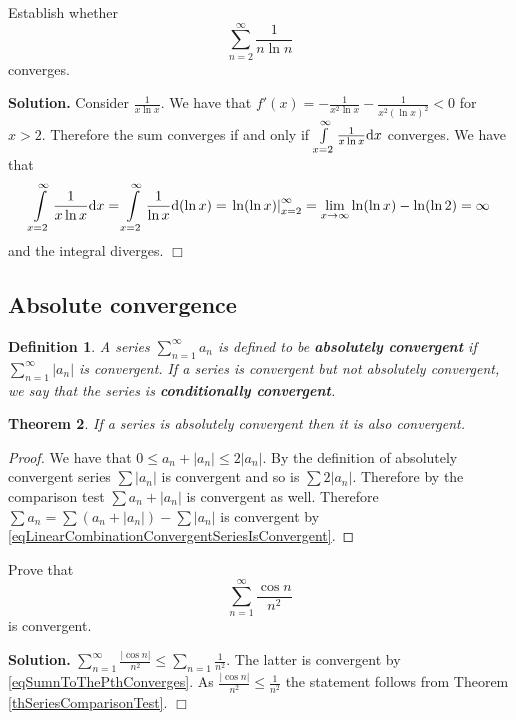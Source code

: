 \documentclass[12pt]{book}
\newenvironment{solution}{\medskip\noindent\textbf{Solution.} }{$\Box$}
\newtheorem{theorem}{Theorem}[section]
\newtheorem{definition}[theorem]{Definition}
\renewcommand{\emph}{\textbf}
\begin{document}
Establish whether
\[ \sum\limits_{n=2}^{\infty}\frac{1}{n\ln n}
\]
converges.

\begin{solution}
Consider $\frac{1}{x\ln x}$. We have that $\displaystyle f'(x)= -\frac{1}{x^2\ln x}- \frac{1}{x^2(\ln x)^2}<0$ for $x>2$. Therefore the sum converges if and only if $\int\limits_{x=2}^{\infty}\frac{1}{x\ln x}{\normalfont \text{d}} x$ converges. We have that
\[ \int\limits_{x=2}^{\infty}\frac{1}{x\ln x}{\normalfont \text{d}} x= \int\limits_{x=2}^\infty \frac{1}{\ln x}{\normalfont \text{d}}(\ln x) = \left.\ln (\ln x)\right|_{x=2}^{\infty}= \lim\limits_{x\to \infty} \ln (\ln x ) - \ln (\ln 2)=\infty
\]
and the integral diverges.
\end{solution}

\subsection{Absolute convergence}
\begin{definition}
A series $\sum_{n=1}^\infty a_n$ is defined to be \emph{absolutely convergent} if $\sum_{n=1}^\infty |a_n|$ is convergent.  If a series is convergent but not absolutely convergent, we say that the series is \emph{conditionally convergent}. 
\end{definition}

\begin{theorem} \label{thAbsoluteConvergenceImpliesConvergence}
If a series is absolutely convergent then it is also convergent.
\end{theorem}

\begin{proof}
We have that $0\leq a_n+|a_n|\leq 2|a_n|$. By the definition of absolutely convergent series $\sum |a_n|$ is convergent and so is $\sum 2|a_n|$. Therefore by the comparison test $\sum a_n+|a_n|$ is convergent as well. Therefore $\sum a_n= \sum (a_n+|a_n|)-\sum |a_n|$  is convergent by \eqref{eqLinearCombinationConvergentSeriesIsConvergent}.
\end{proof}

Prove that
\[
\sum_{n=1}^{\infty} \frac{\cos n}{n^2}
\]
is convergent.

\begin{solution}
$\sum\limits_{n=1}^{\infty} \frac{|\cos n |}{n^2} \leq \sum\limits_{n=1}\frac{1}{n^2}$. The latter is convergent by \eqref{eqSumnToThePthConverges}. As $\frac{|\cos n|}{n^2}\leq \frac{1}{n^2}$ the statement follows from Theorem \ref{thSeriesComparisonTest}.
\end{solution}
\end{document}
